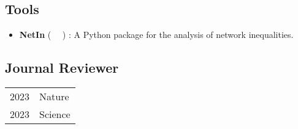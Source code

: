 

\subsection*{Tools}
%
\begin{itemize}
    \item \textbf{NetIn} (~\href{https://pypi.org/project/netin/}{\faPython}
        \hspace{0.5em}\href{https://github.com/CSHVienna/NetworkInequalities}{\faGithub}
        \hspace{0.5em}\href{https://cshvienna.github.io/NetworkInequalities/}{\faFile*[regular]}~)
        : A Python package for the analysis of network inequalities.

\end{itemize}

\subsection*{Journal Reviewer}
%
\begin{longtable}[l]{@{}p{} p{}}
    2023 & Nature\\
    2023 & Science \\
\end{longtable}


